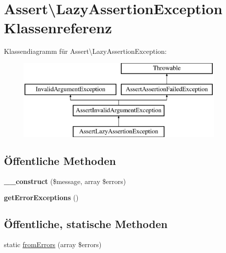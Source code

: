 \hypertarget{class_assert_1_1_lazy_assertion_exception}{}\section{Assert\textbackslash{}Lazy\+Assertion\+Exception Klassenreferenz}
\label{class_assert_1_1_lazy_assertion_exception}
Klassendiagramm für Assert\textbackslash{}Lazy\+Assertion\+Exception\+:\begin{figure}[H]
\begin{center}
\leavevmode
\includegraphics[height=4.000000cm]{class_assert_1_1_lazy_assertion_exception}
\end{center}
\end{figure}
\subsection*{Öffentliche Methoden}
\begin{DoxyCompactItemize}
\item 
\mbox{\label{class_assert_1_1_lazy_assertion_exception_aa22115e06686ad4a48b979e802321e4f}} 
{\bfseries \+\_\+\+\_\+construct} (\$message, array \$errors)
\item 
\mbox{\label{class_assert_1_1_lazy_assertion_exception_aa498dc1287730980c205ecc854c23a04}} 
{\bfseries get\+Error\+Exceptions} ()
\end{DoxyCompactItemize}
\subsection*{Öffentliche, statische Methoden}
\begin{DoxyCompactItemize}
\item 
static \mbox{\hyperlink{class_assert_1_1_lazy_assertion_exception_a27d4136341663ab6231fa78483105613}{from\+Errors}} (array \$errors)
\end{DoxyCompactItemize}


